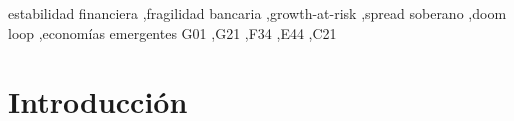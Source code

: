 \documentclass[5p,times,twocolumn,authoryear]{elsarticle}
\begin{document}
\begin{frontmatter}
\begin{abstract}
industrial bancaria del cual esta complementariedad es una predicción de primer orden, y en el que se testea además su amplificación por la concentración del sistema bancario.
\end{abstract}

\begin{keyword}
estabilidad financiera \sep fragilidad bancaria \sep growth-at-risk \sep spread soberano \sep doom loop \sep economías emergentes
\JEL G01 \sep G21 \sep F34 \sep E44 \sep C21
\end{keyword}

\end{frontmatter}

\section{Introducción}
\end{document}
